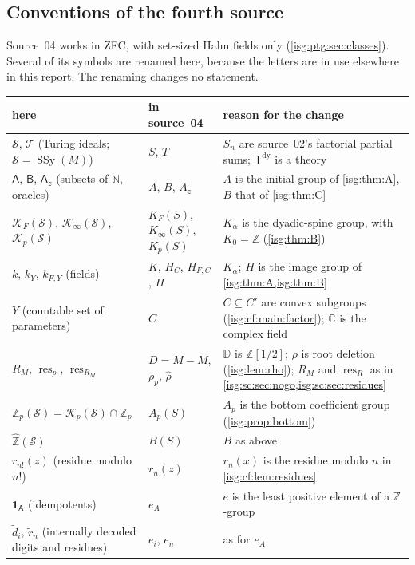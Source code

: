 \documentclass[11pt]{article}
\theoremstyle{definition}
\theoremstyle{remark}
\newcommand{\C}{\mathbb{C}}
\newcommand{\Z}{\mathbb{Z}}
\newcommand{\N}{\mathbb{N}}
\newcommand{\D}{\mathbb{D}}
\newcommand{\Zhat}{\widehat{\Z}}
\newcommand{\res}{\operatorname{res}}
\newcommand{\Tdy}{\mathsf{T}^{\mathrm{dy}}}
\newcommand{\Zp}{\mathbb{Z}_p}
\newcommand{\SSy}{\operatorname{SSy}}
\begin{document}
\subsection{Conventions of the fourth source}\label{isg:ptg:sec:conventions}
Source~04 works in ZFC, with set-sized Hahn fields only
(\cref{isg:ptg:sec:classes}). Several of its symbols are renamed here,
because the letters are in use elsewhere in this report. The renaming
changes no statement.
\begingroup\small
\begin{longtable}{@{}>{\raggedright\arraybackslash}p{}>{\raggedright\arraybackslash}p{}>{\raggedright\arraybackslash}p{}@{}}
\toprule
here & in source~04 & reason for the change\\
\midrule
\endhead
$\mathcal S$, $\mathcal T$ (Turing ideals; $\mathcal S=\SSy(M)$) & $S$, $T$ &
 $S_n$ are source~02's factorial partial sums; $\Tdy$ is a theory\\
$\mathsf A$, $\mathsf B$, $\mathsf A_z$ (subsets of $\N$, oracles) & $A$,
 $B$, $A_z$ & $A$ is the initial group of \cref{isg:thm:A}, $B$ that of
 \cref{isg:thm:C}\\
$\mathcal K_F(\mathcal S)$, $\mathcal K_\infty(\mathcal S)$,
 $\mathcal K_p(\mathcal S)$ & $K_F(S)$, $K_\infty(S)$, $K_p(S)$ & $K_\alpha$
 is the dyadic-spine group, with $K_0=\Z$ (\cref{isg:thm:B})\\
$k$, $k_Y$, $k_{F,Y}$ (fields) & $K$, $H_C$, $H_{F,C}$, $H$ & $K_\alpha$;
 $H$ is the image group of \cref{isg:thm:A,isg:thm:B}\\
$Y$ (countable set of parameters) & $C$ & $C\subseteq C'$ are convex
 subgroups (\cref{isg:cf:main:factor}); $\C$ is the complex field\\
$R_M$, $\res_p$, $\res_{R_M}$ & $D=M-M$, $\rho_p$, $\widehat\rho$ & $\D$
 is $\Z[1/2]$; $\rho$ is root deletion (\cref{isg:lem:rho}); $R_M$ and
 $\res_R$ as in \cref{isg:sc:sec:nogo,isg:sc:sec:residues}\\
$\Zp(\mathcal S)=\mathcal K_p(\mathcal S)\cap\Zp$ & $A_p(S)$ & $A_p$ is the
 bottom coefficient group (\cref{isg:prop:bottom})\\
$\Zhat(\mathcal S)$ & $B(S)$ & $B$ as above\\
$r_{n!}(z)$ (residue modulo $n!$) & $r_n(z)$ & $r_n(x)$ is the residue
 modulo $n$ in \cref{isg:cf:lem:residues}\\
$\mathbf 1_{\mathsf A}$ (idempotents) & $e_A$ & $e$ is the least positive
 element of a $\Z$-group\\
$\tilde d_i$, $\tilde r_n$ (internally decoded digits and residues) & $e_i$, $e_n$ & as for $e_A$\\

\end{longtable}
\end{document}
